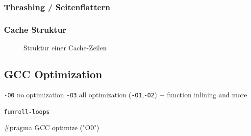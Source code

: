 \documentclass[
  10pt,
  a4paper,
  twocolumn]{article}
\newenvironment{Shaded}{}{}
\newcommand{\PreprocessorTok}[1]{\textcolor[rgb]{0.84,0.23,0.29}{#1}}
\begin{document}
\subsubsection{\texorpdfstring{Thrashing /
\href{https://de.wikipedia.org/wiki/Seitenflattern}{Seitenflattern}}{Thrashing / Seitenflattern}}\label{thrashing-seitenflattern}

\subsubsection{Cache Struktur}\label{cache-struktur}

\begin{figure}[H]


\caption{\label{fig-performance-cache-line-structure}Struktur einer
Cache-Zeilen}

\end{figure}%

\subsection{GCC Optimization}\label{gcc-optimization}

\texttt{-O0} no optimization \texttt{-O3} all optimization
(\texttt{-O1},\texttt{-O2}) + function inlining and more

\texttt{funroll-loops}

\begin{tcolorbox}[enhanced jigsaw, colframe=quarto-callout-tip-color-frame, bottomrule=.15mm, colback=white, left=2mm, toprule=.15mm, arc=.35mm, coltitle=black, opacityback=0, rightrule=.15mm, title=\textcolor{quarto-callout-tip-color}{\faLightbulb}\hspace{0.5em}{Enabling Optimization}, colbacktitle=quarto-callout-tip-color!10!white, opacitybacktitle=0.6, toptitle=1mm, bottomtitle=1mm, titlerule=0mm, leftrule=.75mm, breakable]

\begin{Shaded}
\begin{Highlighting}[]
\PreprocessorTok{\#pragma GCC optimize ("O0")}
\end{Highlighting}
\end{Shaded}

\end{tcolorbox}
\end{document}
